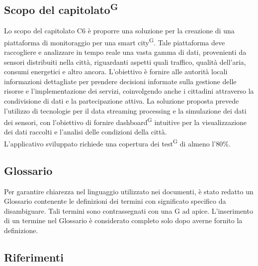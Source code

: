 \documentclass[8pt]{article}
\newcommand{\glossterm}[1]{#1\textsuperscript{G}} %
\begin{document}
\subsection{Scopo del \glossterm{capitolato}}
Lo scopo del capitolato C6 è proporre una soluzione per la creazione di una piattaforma di monitoraggio per una \glossterm{smart city}. Tale piattaforma deve raccogliere e analizzare in tempo reale una vasta gamma di dati, provenienti da sensori distribuiti nella città, riguardanti aspetti quali traffico, qualità dell'aria, consumi energetici e altro ancora. L'obiettivo è fornire alle autorità locali informazioni dettagliate per prendere decisioni informate sulla gestione delle risorse e l'implementazione dei servizi, coinvolgendo anche i cittadini attraverso la condivisione di dati e la partecipazione attiva. La soluzione proposta prevede l'utilizzo di tecnologie per il data streaming processing e la simulazione dei dati dei sensori, con l'obiettivo di fornire \glossterm{dashboard} intuitive per la visualizzazione dei dati raccolti e l'analisi delle condizioni della città.\\
L’applicativo sviluppato richiede una copertura dei \glossterm{test} di almeno l’80\%.

\subsection{Glossario}
Per garantire chiarezza nel linguaggio utilizzato nei documenti, è stato redatto un Glossario contenente le definizioni dei termini con significato specifico da disambiguare. Tali termini sono contrassegnati con una G ad apice. L'inserimento di un termine nel Glossario è considerato completo solo dopo averne fornito la definizione.
\subsection{Riferimenti}
\end{document}
